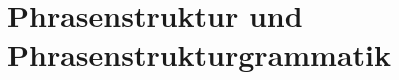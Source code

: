 \documentclass[handout,aspectratio=1610,dvipsnames]{beamer}
\begin{document}
  \section[Phrasenstrukturgrammatik]{Phrasenstruktur und Phrasenstrukturgrammatik}
  \let\woopsi\section\let\section\subsection\let\subsection\subsubsection
  
  \let\subsection\section\let\section\woopsi
\end{document}
